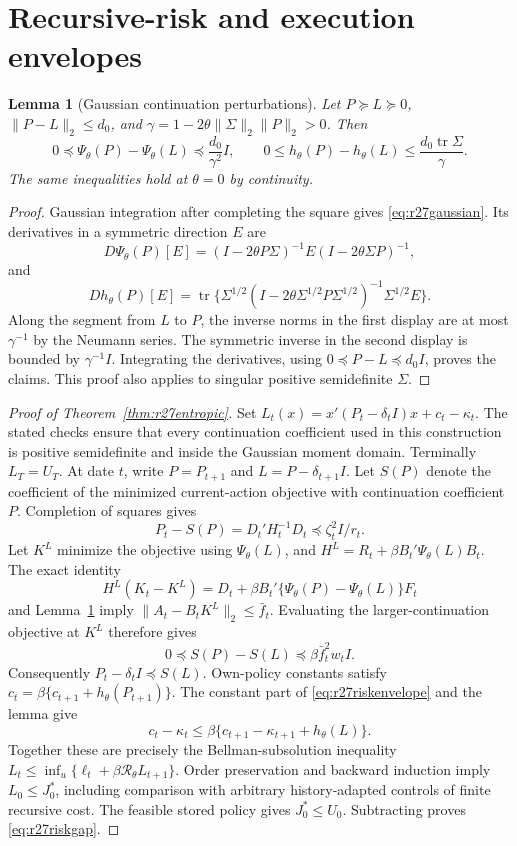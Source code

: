 \documentclass[ecta,nameyear,draft]{econsocart}
\newtheorem{lemma}[theorem]{Lemma}
\theoremstyle{definition}
\theoremstyle{remark}
\newcommand{\tr}{\operatorname{tr}}
\begin{document}
\section{Recursive-risk and execution envelopes}
\label{sec:r27riskproof}
\begin{lemma}[Gaussian continuation perturbations]\label{lem:r27riskderivative}
Let $P\succeq L\succeq0$, $\|P-L\|_2\leq d_0$, and
$\gamma=1-2\theta\|\Sigma\|_2\|P\|_2>0$. Then
\[
 0\preceq\Psi_\theta(P)-\Psi_\theta(L)
       \preceq\frac{d_0}{\gamma^2}I,\qquad
 0\leq h_\theta(P)-h_\theta(L)
       \leq\frac{d_0\tr\Sigma}{\gamma}.
\]
The same inequalities hold at $\theta=0$ by continuity.
\end{lemma}
\begin{proof}
Gaussian integration after completing the square gives
\eqref{eq:r27gaussian}. Its derivatives in a symmetric direction $E$ are
\[
 D\Psi_\theta(P)[E]
 =(I-2\theta P\Sigma)^{-1}E(I-2\theta\Sigma P)^{-1},
\]
and
\[
 Dh_\theta(P)[E]
 =\tr\{\Sigma^{1/2}(I-2\theta\Sigma^{1/2}P\Sigma^{1/2})^{-1}
                      \Sigma^{1/2}E\}.
\]
Along the segment from $L$ to $P$, the inverse norms in the first display are
at most $\gamma^{-1}$ by the Neumann series. The symmetric inverse in the
second display is bounded by $\gamma^{-1}I$. Integrating the derivatives,
using $0\preceq P-L\preceq d_0I$, proves the claims. This proof also applies
to singular positive semidefinite $\Sigma$.
\end{proof}

\begin{proof}[Proof of Theorem~\ref{thm:r27entropic}]
Set $L_t(x)=x'(P_t-\delta_tI)x+c_t-\kappa_t$. The stated checks ensure that
every continuation coefficient used in this construction is positive
semidefinite and inside the Gaussian moment domain. Terminally $L_T=U_T$.
At date $t$, write $P=P_{t+1}$ and $L=P-\delta_{t+1}I$.
Let $S(P)$ denote the coefficient of the minimized current-action objective
with continuation coefficient $P$. Completion of squares gives
\[
 P_t-S(P)=D_t'H_t^{-1}D_t\preceq\zeta_t^2I/r_t.
\]
Let $K^L$ minimize the objective using $\Psi_\theta(L)$, and
$H^L=R_t+\beta B_t'\Psi_\theta(L)B_t$. The exact identity
\[
 H^L(K_t-K^L)
 =D_t+\beta B_t'\{\Psi_\theta(P)-\Psi_\theta(L)\}F_t
\]
and Lemma~\ref{lem:r27riskderivative} imply
$\|A_t-B_tK^L\|_2\leq\bar f_t$.
Evaluating the larger-continuation objective at $K^L$ therefore gives
\[
 0\preceq S(P)-S(L)\preceq\beta\bar f_t^2w_t I.
\]
Consequently $P_t-\delta_tI\preceq S(L)$. Own-policy constants satisfy
$c_t=\beta\{c_{t+1}+h_\theta(P_{t+1})\}$.
The constant part of \eqref{eq:r27riskenvelope} and the lemma give
\[
 c_t-\kappa_t\leq
 \beta\{c_{t+1}-\kappa_{t+1}+h_\theta(L)\}.
\]
Together these are precisely the Bellman-subsolution inequality
$L_t\leq\inf_u\{\ell_t+\beta\mathcal R_\theta L_{t+1}\}$.
Order preservation and backward induction imply $L_0\leq J_0^*$, including
comparison with arbitrary history-adapted controls of finite recursive cost.
The feasible stored policy gives $J_0^*\leq U_0$. Subtracting proves
\eqref{eq:r27riskgap}.
\end{proof}
\end{document}
